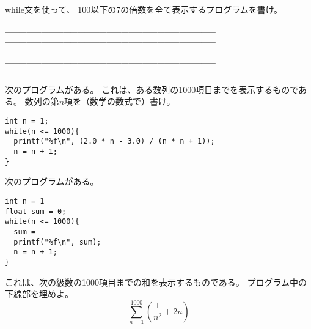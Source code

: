 \documentclass[12pt,a4j]{jarticle}
\def\ds{\displaystyle}
\newcounter{toi}
\def\toi{%
\bigskip\bigskip\noindent
\addtocounter{toi}{1}
\shadowbox{\bfseries\large 問\thetoi}
\nopagebreak[4]\bigskip\nopagebreak[4]
}
\begin{document}





\toi

{\ttfamily while}文を使って、
100以下の7の倍数を全て表示するプログラムを書け。

\begin{verbatim}
＿＿＿＿＿＿＿＿＿＿＿＿＿＿＿＿＿＿＿＿＿＿＿＿＿＿＿＿＿
＿＿＿＿＿＿＿＿＿＿＿＿＿＿＿＿＿＿＿＿＿＿＿＿＿＿＿＿＿
＿＿＿＿＿＿＿＿＿＿＿＿＿＿＿＿＿＿＿＿＿＿＿＿＿＿＿＿＿
＿＿＿＿＿＿＿＿＿＿＿＿＿＿＿＿＿＿＿＿＿＿＿＿＿＿＿＿＿
＿＿＿＿＿＿＿＿＿＿＿＿＿＿＿＿＿＿＿＿＿＿＿＿＿＿＿＿＿
\end{verbatim}





\toi

次のプログラムがある。
これは、ある数列の1000項目までを表示するものである。
数列の第$n$項を（数学の数式で）書け。
\begin{verbatim}
int n = 1;
while(n <= 1000){
  printf("%f\n", (2.0 * n - 3.0) / (n * n + 1));
  n = n + 1;
}
\end{verbatim}


\myanswer{
$\ds\frac{2n-3}{n^2+1}$
}





\toi

次のプログラムがある。
\begin{verbatim}
int n = 1
float sum = 0;
while(n <= 1000){
  sum = ＿＿＿＿＿＿＿＿＿＿＿＿＿＿＿＿＿＿＿＿＿
  printf("%f\n", sum);
  n = n + 1;
}
\end{verbatim}
これは、次の級数の1000項目までの和を表示するものである。
プログラム中の下線部を埋めよ。
\[
 \sum_{n=1}^{1000} \left( \frac{1}{n^2}+2n \right) 
\]







\toi
\end{document}
